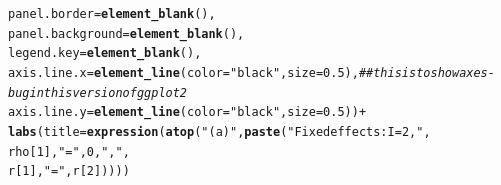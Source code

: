 \documentclass{article}\usepackage[]{graphicx}\usepackage[]{color}
\makeatletter
\newcommand{\hlnum}[1]{\textcolor[rgb]{0.686,0.059,0.569}{#1}}%
\newcommand{\hlstr}[1]{\textcolor[rgb]{0.192,0.494,0.8}{#1}}%
\newcommand{\hlcom}[1]{\textcolor[rgb]{0.678,0.584,0.686}{\textit{#1}}}%
\newcommand{\hlopt}[1]{\textcolor[rgb]{0,0,0}{#1}}%
\newcommand{\hlstd}[1]{\textcolor[rgb]{0.345,0.345,0.345}{#1}}%
\newcommand{\hlkwc}[1]{\textcolor[rgb]{0.333,0.667,0.333}{#1}}%
\newcommand{\hlkwd}[1]{\textcolor[rgb]{0.737,0.353,0.396}{\textbf{#1}}}%
\newenvironment{kframe}{%
 \def\at@end@of@kframe{}%
 \ifinner\ifhmode%
  \def\at@end@of@kframe{\end{minipage}}%
  \begin{minipage}{\columnwidth}%
 \fi\fi%
 \def\FrameCommand##1{\hskip\@totalleftmargin \hskip-\fboxsep
 \colorbox{shadecolor}{##1}\hskip-\fboxsep
     \hskip-\linewidth \hskip-\@totalleftmargin \hskip\columnwidth}%
 \MakeFramed {\advance\hsize-\width
   \@totalleftmargin\z@ \linewidth\hsize
   \@setminipage}}%
 {\par\unskip\endMakeFramed%
 \at@end@of@kframe}
\newenvironment{knitrout}{}{} %
\makeatother
\begin{document}
\begin{knitrout}
\begin{kframe}
\begin{alltt}
        \hlkwc{panel.border} \hlstd{=} \hlkwd{element_blank}\hlstd{(),}
        \hlkwc{panel.background} \hlstd{=} \hlkwd{element_blank}\hlstd{(),}
        \hlkwc{legend.key} \hlstd{=} \hlkwd{element_blank}\hlstd{(),}
        \hlkwc{axis.line.x} \hlstd{=} \hlkwd{element_line}\hlstd{(}\hlkwc{color}\hlstd{=}\hlstr{"black"}\hlstd{,} \hlkwc{size} \hlstd{=} \hlnum{0.5}\hlstd{),} \hlcom{##this is to show axes - bug in this version of ggplot2}
        \hlkwc{axis.line.y} \hlstd{=} \hlkwd{element_line}\hlstd{(}\hlkwc{color}\hlstd{=}\hlstr{"black"}\hlstd{,} \hlkwc{size} \hlstd{=} \hlnum{0.5}\hlstd{))} \hlopt{+}
  \hlkwd{labs}\hlstd{(}\hlkwc{title}\hlstd{=}\hlkwd{expression}\hlstd{(}\hlkwd{atop}\hlstd{(}\hlstr{"(a)"}\hlstd{,} \hlkwd{paste}\hlstd{(}\hlstr{"Fixed effects: I = 2, "}\hlstd{,}
                                          \hlstd{rho[}\hlnum{1}\hlstd{],} \hlstr{" = "}\hlstd{,} \hlnum{0}\hlstd{,} \hlstr{", "}\hlstd{,}
                                          \hlstd{r[}\hlnum{1}\hlstd{],} \hlstr{" = "}\hlstd{, r[}\hlnum{2}\hlstd{]))))}
\end{alltt}
\end{kframe}
\end{knitrout}
\end{document}
